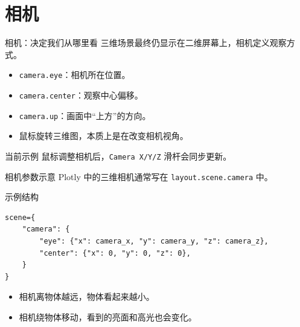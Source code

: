\documentclass[aspectratio=169,11pt]{ctexbeamer}
\begin{document}


\section{相机}

\begin{frame}{相机：决定我们从哪里看}
  三维场景最终仍显示在二维屏幕上，相机定义观察方式。

  \begin{itemize}
    \item \texttt{camera.eye}：相机所在位置。
    \item \texttt{camera.center}：观察中心偏移。
    \item \texttt{camera.up}：画面中“上方”的方向。
    \item 鼠标旋转三维图，本质上是在改变相机视角。
  \end{itemize}

  \begin{block}{当前示例}
    鼠标调整相机后，\texttt{Camera X/Y/Z} 滑杆会同步更新。
  \end{block}
\end{frame}

\begin{frame}[fragile]{相机参数示意}
  Plotly 中的三维相机通常写在 \texttt{layout.scene.camera} 中。

  \begin{block}{示例结构}
\begin{Verbatim}[fontsize=\small]
scene={
    "camera": {
        "eye": {"x": camera_x, "y": camera_y, "z": camera_z},
        "center": {"x": 0, "y": 0, "z": 0},
    }
}
\end{Verbatim}
  \end{block}

  \begin{itemize}
    \item 相机离物体越远，物体看起来越小。
    \item 相机绕物体移动，看到的亮面和高光也会变化。
  \end{itemize}
\end{frame}
\end{document}
